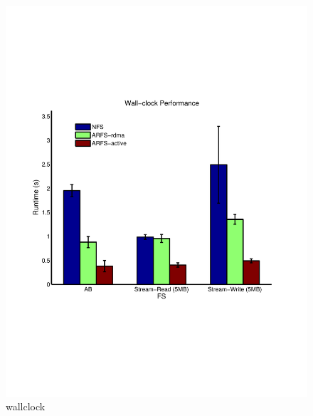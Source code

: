 \documentclass[10pt]{article}
\begin{document}
\begin{itemize}
\begin{itemize}
\begin{figure}
  \centering
\includegraphics[scale=0.5, trim = 0 200 0 200]{../../results/matlab/wallclock.pdf}
  \caption{wallclock}\label{wallclock}
\end{figure}


\end{itemize}
\end{itemize}
\end{document}
